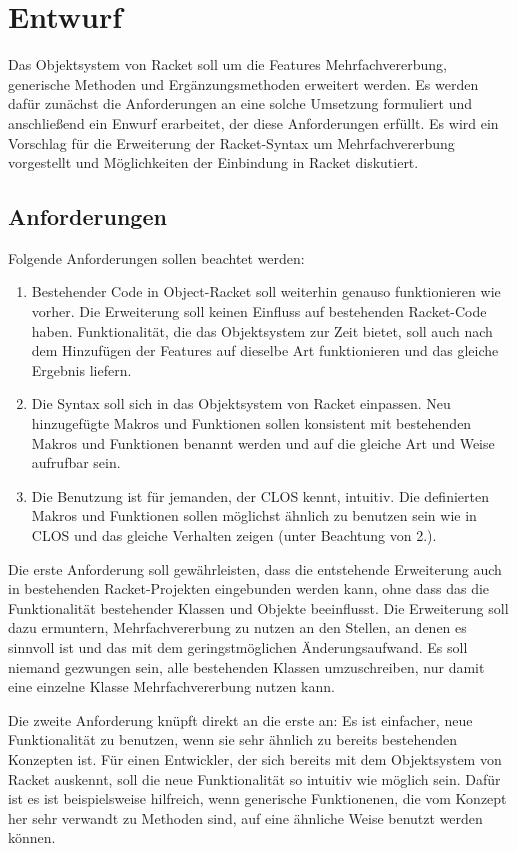 \chapter{Entwurf} 
Das Objektsystem von Racket soll um die Features Mehrfachvererbung, generische Methoden und Ergänzungsmethoden erweitert werden. Es werden dafür zunächst die Anforderungen an eine solche Umsetzung formuliert und anschließend ein Enwurf erarbeitet, der diese Anforderungen erfüllt. Es wird ein Vorschlag für die Erweiterung der Racket-Syntax um Mehrfachvererbung vorgestellt und Möglichkeiten der Einbindung in Racket diskutiert.

\section{Anforderungen}
Folgende Anforderungen sollen beachtet werden:
\begin{enumerate}
 \item Bestehender Code in Object-Racket soll weiterhin genauso funktionieren wie vorher. Die Erweiterung soll keinen Einfluss auf bestehenden Racket-Code haben. Funktionalität, die das Objektsystem zur Zeit bietet, soll auch nach dem Hinzufügen der Features auf dieselbe Art funktionieren und das gleiche Ergebnis liefern.
 \item Die Syntax soll sich in das Objektsystem von Racket einpassen. Neu hinzugefügte Makros und Funktionen sollen konsistent mit bestehenden Makros und Funktionen benannt werden und auf die gleiche Art und Weise aufrufbar sein. 
 \item Die Benutzung ist für jemanden, der CLOS kennt, intuitiv. Die definierten Makros und Funktionen sollen möglichst ähnlich zu benutzen sein wie in CLOS und das gleiche Verhalten zeigen (unter Beachtung von 2.).
\end{enumerate}

Die erste Anforderung soll gewährleisten, dass die entstehende Erweiterung auch in bestehenden Racket-Projekten eingebunden werden kann, ohne dass das die Funktionalität bestehender Klassen und Objekte beeinflusst. Die Erweiterung soll dazu ermuntern, Mehrfachvererbung zu nutzen an den Stellen, an denen es sinnvoll ist und das mit dem geringstmöglichen Änderungsaufwand. Es soll niemand gezwungen sein, alle bestehenden Klassen umzuschreiben, nur damit eine einzelne Klasse Mehrfachvererbung nutzen kann.

Die zweite Anforderung knüpft direkt an die erste an: Es ist einfacher, neue Funktionalität zu benutzen, wenn sie sehr ähnlich zu bereits bestehenden Konzepten ist. Für einen Entwickler, der sich bereits mit dem Objektsystem von Racket auskennt, soll die neue Funktionalität so intuitiv wie möglich sein. Dafür ist es ist beispielsweise hilfreich, wenn generische Funktionenen, die vom Konzept her sehr verwandt zu Methoden sind, auf eine ähnliche Weise benutzt werden können.

